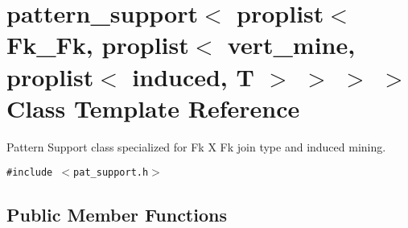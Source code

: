 \section{pattern\_\-support$<$ proplist$<$ Fk\_\-Fk, proplist$<$ vert\_\-mine, proplist$<$ induced, T $>$ $>$ $>$ $>$ Class Template Reference}
\label{classpattern__support_3_01proplist_3_01Fk__Fk_00_01proplist_3_01vert__mine_00_01proplist_3_01induced_00_01T_01_4_01_4_01_4_01_4}
Pattern Support class specialized for Fk X Fk join type and induced mining.  


{\tt \#include $<$pat\_\-support.h$>$}

\subsection*{Public Member Functions}
